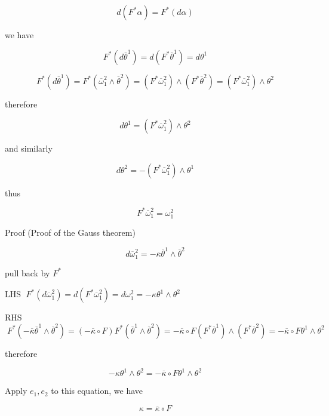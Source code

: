 \documentclass[lang=cn,a4paper,11pt,openany,twoside]{elegantbook}
\begin{document}
\[
d\left( {{F}^{ * }\alpha }\right)  = {F}^{ * }\left( {d\alpha }\right)
\]

we have

\[
{F}^{ * }\left( {d{\overline{\theta }}^{1}}\right)  = d\left( {{F}^{ * }{\overline{\theta }}^{1}}\right)  = d{\theta }^{1}
\]

\[
{F}^{ * }\left( {d{\overline{\theta }}^{1}}\right)  = {F}^{ * }\left( {{\overline{\omega }}_{1}^{2} \land  {\overline{\theta }}^{2}}\right)  = \left( {{F}^{ * }{\overline{\omega }}_{1}^{2}}\right)  \land  \left( {{F}^{ * }{\overline{\theta }}^{2}}\right)  = \left( {{F}^{ * }{\overline{\omega }}_{1}^{2}}\right)  \land  {\theta }^{2}
\]

therefore

\[
d{\theta }^{1} = \left( {{F}^{ * }{\overline{\omega }}_{1}^{2}}\right)  \land  {\theta }^{2}
\]

and similarly

\[
d{\theta }^{2} =  - \left( {{F}^{ * }{\overline{\omega }}_{1}^{2}}\right)  \land  {\theta }^{1}
\]

thus

\[
{F}^{ * }{\overline{\omega }}_{1}^{2} = {\omega }_{1}^{2}
\]

Proof (Proof of the Gauss theorem)

\[
d{\overline{\omega }}_{1}^{2} =  - \overline{\kappa }{\overline{\theta }}^{1} \land  {\overline{\theta }}^{2}
\]

pull back by \({F}^{ * }\)

LHS \(\;{F}^{ * }\left( {d{\overline{\omega }}_{1}^{2}}\right)  = d\left( {{F}^{ * }{\overline{\omega }}_{1}^{2}}\right)  = d{\omega }_{1}^{2} =  - \kappa {\theta }^{1} \land  {\theta }^{2}\)

RHS \(\;{F}^{ * }\left( {-\overline{\kappa }{\overline{\theta }}^{1} \land  {\overline{\theta }}^{2}}\right)  = \left( {-\overline{\kappa } \circ  F}\right) {F}^{ * }\left( {{\overline{\theta }}^{1} \land  {\overline{\theta }}^{2}}\right)  =  - \overline{\kappa } \circ  F\left( {{F}^{ * }{\overline{\theta }}^{1}}\right)  \land  \left( {{F}^{ * }{\overline{\theta }}^{2}}\right)  =  - \overline{\kappa } \circ  F{\theta }^{1} \land  {\theta }^{2}\)

therefore

\[
- \kappa {\theta }^{1} \land  {\theta }^{2} =  - \overline{\kappa } \circ  F{\theta }^{1} \land  {\theta }^{2}
\]

Apply \({e}_{1},{e}_{2}\) to this equation, we have

\[
\kappa  = \overline{\kappa } \circ  F
\]
\end{document}
